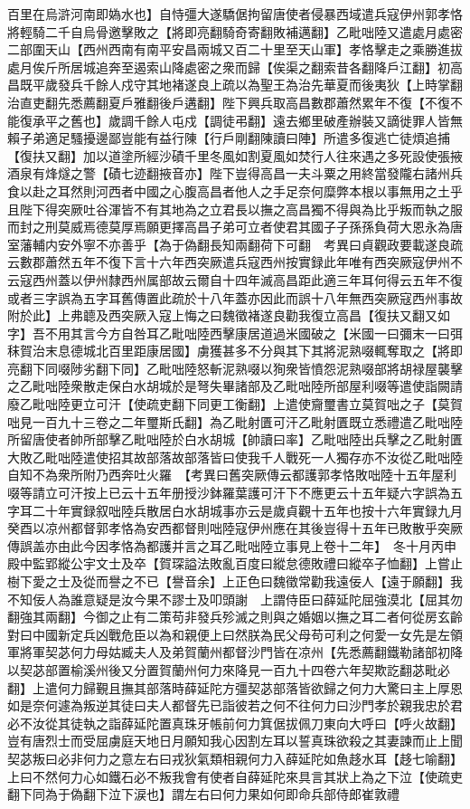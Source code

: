 百里在烏滸河南即媯水也】自恃彊大遂驕倨拘留唐使者侵暴西域遣兵寇伊州郭孝恪將輕騎二千自烏骨邀擊敗之【將即亮翻騎奇寄翻敗補邁翻】乙毗咄陸又遣處月處密二部圍天山【西州西南有南平安昌兩城又百二十里至天山軍】孝恪擊走之乘勝進拔處月俟斤所居城追奔至遏索山降處密之衆而歸【俟渠之翻索昔各翻降戶江翻】初高昌既平歲發兵千餘人戍守其地褚遂良上疏以為聖王為治先華夏而後夷狄【上時掌翻治直吏翻先悉薦翻夏戶雅翻後戶遘翻】陛下興兵取高昌數郡蕭然累年不復【不復不能復承平之舊也】歲調千餘人屯戍【調徒弔翻】遠去鄉里破產辦裝又謫徙罪人皆無賴子弟適足騷擾邊鄙豈能有益行陳【行戶剛翻陳讀曰陣】所遣多復逃亡徒煩追捕【復扶又翻】加以道塗所經沙磧千里冬風如割夏風如焚行人往來遇之多死設使張掖酒泉有烽燧之警【磧七迹翻掖音亦】陛下豈得高昌一夫斗粟之用終當發隴右諸州兵食以赴之耳然則河西者中國之心腹高昌者他人之手足奈何糜弊本根以事無用之土乎且陛下得突厥吐谷渾皆不有其地為之立君長以撫之高昌獨不得與為比乎叛而執之服而封之刑莫威焉德莫厚焉願更擇高昌子弟可立者使君其國子子孫孫負荷大恩永為唐室藩輔内安外寧不亦善乎【為于偽翻長知兩翻荷下可翻　考異曰貞觀政要載遂良疏云數郡蕭然五年不復下言十六年西突厥遣兵寇西州按實録此年唯有西突厥寇伊州不云寇西州蓋以伊州隸西州属部故云爾自十四年滅高昌距此適三年耳何得云五年不復或者三字誤為五字耳舊傳置此疏於十八年蓋亦因此而誤十八年無西突厥寇西州事故附於此】上弗聼及西突厥入寇上悔之曰魏徵褚遂良勸我復立高昌【復扶又翻又如字】吾不用其言今方自咎耳乙毗咄陸西擊康居道過米國破之【米國一曰彌末一曰弭秣賀治末息德城北百里距康居國】虜獲甚多不分與其下其將泥熟啜輒奪取之【將即亮翻下同啜陟劣翻下同】乙毗咄陸怒斬泥熟啜以狥衆皆憤怨泥熟啜部將胡禄屋襲擊之乙毗咄陸衆散走保白水胡城於是弩失畢諸部及乙毗咄陸所部屋利啜等遣使詣闕請廢乙毗咄陸更立可汗【使疏吏翻下同更工衡翻】上遣使齎璽書立莫賀咄之子【莫賀咄見一百九十三卷之二年璽斯氏翻】為乙毗射匱可汗乙毗射匱既立悉禮遣乙毗咄陸所留唐使者帥所部擊乙毗咄陸於白水胡城【帥讀曰率】乙毗咄陸出兵擊之乙毗射匱大敗乙毗咄陸遣使招其故部落故部落皆曰使我千人戰死一人獨存亦不汝從乙毗咄陸自知不為衆所附乃西奔吐火羅　【考異曰舊突厥傳云都護郭孝恪敗咄陸十五年屋利啜等請立可汗按上已云十五年册授沙鉢羅葉護可汗下不應更云十五年疑六字誤為五字耳二十年實録叙咄陸兵散居白水胡城事亦云是歲貞觀十五年也按十六年實録九月癸酉以凉州都督郭孝恪為安西都督則咄陸寇伊州應在其後豈得十五年已敗散乎突厥傳誤盖亦由此今因孝恪為都護并言之耳乙毗咄陸立事見上卷十二年】　冬十月丙申殿中監郢縱公宇文士及卒【賀琛謚法敗亂百度曰縱怠德敗禮曰縱卒子恤翻】上嘗止樹下愛之士及從而譽之不已【譽音余】上正色曰魏徵常勸我遠佞人【遠于願翻】我不知佞人為誰意疑是汝今果不謬士及叩頭謝　上謂侍臣曰薛延陀屈強漠北【屈其勿翻強其兩翻】今御之止有二策苟非發兵殄滅之則與之婚姻以撫之耳二者何從房玄齡對曰中國新定兵凶戰危臣以為和親便上曰然朕為民父母苟可利之何愛一女先是左領軍將軍契苾何力母姑臧夫人及弟賀蘭州都督沙門皆在凉州【先悉薦翻鐵勒諸部初降以契苾部置榆溪州後又分置賀蘭州何力來降見一百九十四卷六年契欺訖翻苾毗必翻】上遣何力歸覲且撫其部落時薛延陀方彊契苾部落皆欲歸之何力大驚曰主上厚恩如是奈何遽為叛逆其徒曰夫人都督先已詣彼若之何不往何力曰沙門孝於親我忠於君必不汝從其徒執之詣薛延陀置真珠牙帳前何力箕倨拔佩刀東向大呼曰【呼火故翻】豈有唐烈士而受屈虜庭天地日月願知我心因割左耳以誓真珠欲殺之其妻諫而止上聞契苾叛曰必非何力之意左右曰戎狄氣類相親何力入薛延陀如魚趍水耳【趍七喻翻】上曰不然何力心如鐵石必不叛我會有使者自薛延陀來具言其狀上為之下泣【使疏吏翻下同為于偽翻下泣下涙也】謂左右曰何力果如何即命兵部侍郎崔敦禮